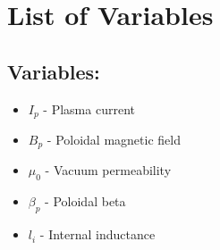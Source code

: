 \chapter*{List of Variables}
\begin{multicols}{2}
\section*{Variables:}
\begin{itemize}
\item $I_p$ - Plasma current
\item $B_p$ - Poloidal magnetic field
\item $\mu_0$ - Vacuum permeability
\item $\beta_p$ - Poloidal beta
\item $l_i$ - Internal inductance

\end{itemize}

\end{multicols}